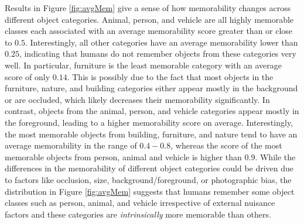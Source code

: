 Results in Figure \ref{fig:avgMem} give a sense of how  memorability changes across different object categories. Animal, person, and vehicle are all highly memorable classes each associated with  an average memorability score greater than or close to $0.5$. Interestingly, all other categories have an average memorability lower than $0.25$, indicating that humans do not remember objects from these categories very well. In particular, furniture is the least memorable category with an average score of only $0.14$. This is possibly due to the fact that most objects in the furniture, nature, and building categories either appear mostly in the background or are occluded, which likely decreases their memorability significantly. In contrast, objects from the animal, person, and vehicle categories appear mostly in the foreground, leading to a higher memorability score on average. Interestingly, the most memorable objects from building, furniture, and nature tend to have an average memorability in the range of $0.4 - 0.8$, whereas the score of the most memorable objects from person, animal and vehicle is higher than $0.9$. %
While the differences in the memorability of different object categories could be driven due to factors like occlusion, size, background/foreground, or photographic bias, the distribution in Figure \ref{fig:avgMem} suggests that humans remember some object classes such as person, animal, and vehicle irrespective of external nuisance factors and these categories are \textit{intrinsically} more memorable than others.


%

